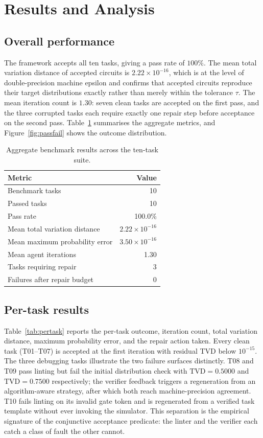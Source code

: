 \documentclass[11pt,a4paper]{article}
\newcounter{algo}
\newcommand{\tvd}{\mathrm{TVD}}
\begin{document}
\section{Results and Analysis}
\label{sec:results}

\subsection{Overall performance}
The framework accepts all ten tasks, giving a pass rate of $100\%$. The mean total variation distance of accepted circuits is $2.22\times10^{-16}$, which is at the level of double-precision machine epsilon and confirms that accepted circuits reproduce their target distributions exactly rather than merely within the tolerance $\tau$. The mean iteration count is $1.30$: seven clean tasks are accepted on the first pass, and the three corrupted tasks each require exactly one repair step before acceptance on the second pass. Table~\ref{tab:aggregate} summarises the aggregate metrics, and Figure~\ref{fig:passfail} shows the outcome distribution.

\begin{table}[H]
\centering
\caption{Aggregate benchmark results across the ten-task suite.}
\label{tab:aggregate}
\small
\begin{tabular}{@{}lr@{}}
\toprule
\textbf{Metric} & \textbf{Value} \\
\midrule
Benchmark tasks & 10 \\
Passed tasks & 10 \\
Pass rate & 100.0\% \\
Mean total variation distance & $2.22\times10^{-16}$ \\
Mean maximum probability error & $3.50\times10^{-16}$ \\
Mean agent iterations & 1.30 \\
Tasks requiring repair & 3 \\
Failures after repair budget & 0 \\
\bottomrule
\end{tabular}
\end{table}

\subsection{Per-task results}
Table~\ref{tab:pertask} reports the per-task outcome, iteration count, total variation distance, maximum probability error, and the repair action taken. Every clean task (T01--T07) is accepted at the first iteration with residual TVD below $10^{-15}$. The three debugging tasks illustrate the two failure surfaces distinctly. T08 and T09 pass linting but fail the initial distribution check with $\tvd=0.5000$ and $\tvd=0.7500$ respectively; the verifier feedback triggers a regeneration from an algorithm-aware strategy, after which both reach machine-precision agreement. T10 fails linting on its invalid gate token and is regenerated from a verified task template without ever invoking the simulator. This separation is the empirical signature of the conjunctive acceptance predicate: the linter and the verifier each catch a class of fault the other cannot.
\end{document}
